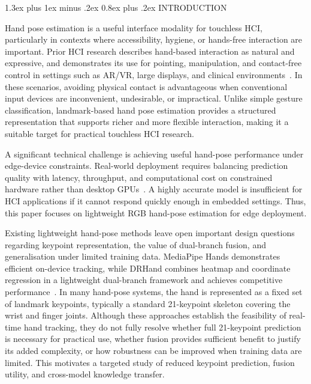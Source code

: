 ﻿\documentclass[10pt,letterpaper]{article}
\makeatletter
\renewcommand\section{\@startsection{section}{1}{\z@}%
  {1.3ex plus 1ex minus .2ex}%
  {0.8ex plus .2ex}%
  {\centering\normalfont\small\scshape}}
\makeatother
\begin{document}
\section{INTRODUCTION}

\medskip
Hand pose estimation is a useful interface modality for touchless HCI, particularly in contexts where accessibility, hygiene, or hands-free interaction are important. Prior HCI research describes hand-based interaction as natural and expressive, and demonstrates its use for pointing, manipulation, and contact-free control in settings such as AR/VR, large displays, and clinical environments~\cite{vuletic,wachs,li_vr}. In these scenarios, avoiding physical contact is advantageous when conventional input devices are inconvenient, undesirable, or impractical. Unlike simple gesture classification, landmark-based hand pose estimation provides a structured representation that supports richer and more flexible interaction, making it a suitable target for practical touchless HCI research.

\medskip
A significant technical challenge is achieving useful hand-pose performance under edge-device constraints. Real-world deployment requires balancing prediction quality with latency, throughput, and computational cost on constrained hardware rather than desktop GPUs~\cite{attentionlite,srhandnet,dualreg}. A highly accurate model is insufficient for HCI applications if it cannot respond quickly enough in embedded settings. Thus, this paper focuses on lightweight RGB hand-pose estimation for edge deployment.

\medskip
Existing lightweight hand-pose methods leave open important design questions regarding keypoint representation, the value of dual-branch fusion, and generalisation under limited training data. MediaPipe Hands demonstrates efficient on-device tracking, while DRHand combines heatmap and coordinate regression in a lightweight dual-branch framework and achieves competitive performance~\cite{mediapipe,dualreg}. In many hand-pose systems, the hand is represented as a fixed set of landmark keypoints, typically a standard 21-keypoint skeleton covering the wrist and finger joints. Although these approaches establish the feasibility of real-time hand tracking, they do not fully resolve whether full 21-keypoint prediction is necessary for practical use, whether fusion provides sufficient benefit to justify its added complexity, or how robustness can be improved when training data are limited. This motivates a targeted study of reduced keypoint prediction, fusion utility, and cross-model knowledge transfer.
\end{document}
